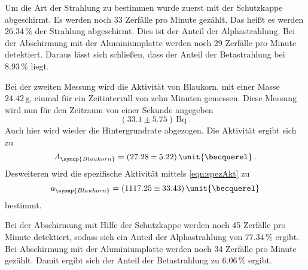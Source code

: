 Um die Art der Strahlung zu bestimmen wurde zuerst mit der Schutzkappe abgeschirmt. Es werden noch 33 Zerfälle pro Minute gezählt. Das heißt es werden
$26.34 \, \%$ der Strahlung abgeschirmt. Dies ist der Anteil der Alphastrahlung. Bei der Abschirmung mit der Aluminiumplatte werden noch 29 
Zerfälle pro Minute detektiert. Daraus lässt sich schließen, dass der Anteil der Betastrahlung bei $8.93 \,\%$ liegt.

Bei der zweiten Messung wird die Aktivität von Blaukorn, mit einer Masse $24.42\,\unit{\gram}$, einmal für ein Zeitintervall von zehn Minuten gemessen.
Diese Messung wird nun für den Zeitraum von einer Sekunde angegeben
\begin{equation*}
    (33.1 \pm 5.75) \,\unit{\becquerel} \; .
\end{equation*}
Auch hier wird wieder die Hintergrundrate abgezogen. Die Aktivität ergibt sich zu 
\begin{equation*}
    A_{\symup{Blaukorn}} = (27.28 \pm 5.22) \, \unit{\becquerel} \; .
\end{equation*}
Desweiteren wird die spezifische Aktivität mittels \autoref{eqn:spezAkt} zu 
\begin{equation*}
    a_{\symup{Blaukorn}} = (1117.25 \pm 33.43) \,\unit{\becquerel}
\end{equation*} 
bestimmt. 

Bei der Abschirmung mit Hilfe der Schutzkappe werden noch 45 Zerfälle pro Minute detektiert, sodass sich ein Anteil der Alphastrahlung von $77.34 \,\%$ 
ergibt. Bei Abschirmung mit der Aluminiumplatte werden noch 34 Zerfälle pro Minute gezählt. Damit ergibt sich der Anteil der Betastrahlung zu 
$6.06 \,\%$ ergibt.